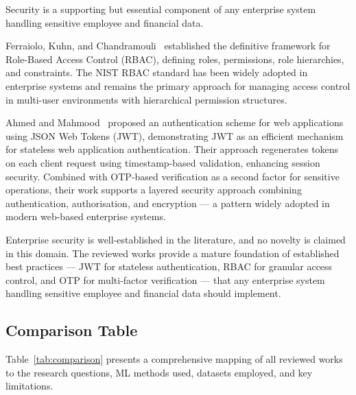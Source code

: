 \documentclass[12pt,a4paper]{article}
\begin{document}
Security is a supporting but essential component of any enterprise system handling sensitive employee and financial data.

Ferraiolo, Kuhn, and Chandramouli~\cite{ferraiolo2007rbac} established the definitive framework for Role-Based Access Control (RBAC), defining roles, permissions, role hierarchies, and constraints. The NIST RBAC standard has been widely adopted in enterprise systems and remains the primary approach for managing access control in multi-user environments with hierarchical permission structures.

Ahmed and Mahmood~\cite{ahmed2019jwt} proposed an authentication scheme for web applications using JSON Web Tokens (JWT), demonstrating JWT as an efficient mechanism for stateless web application authentication. Their approach regenerates tokens on each client request using timestamp-based validation, enhancing session security. Combined with OTP-based verification as a second factor for sensitive operations, their work supports a layered security approach combining authentication, authorisation, and encryption --- a pattern widely adopted in modern web-based enterprise systems.

Enterprise security is well-established in the literature, and no novelty is claimed in this domain. The reviewed works provide a mature foundation of established best practices --- JWT for stateless authentication, RBAC for granular access control, and OTP for multi-factor verification --- that any enterprise system handling sensitive employee and financial data should implement.

\subsection{Comparison Table}
\label{sec:comparison}

Table~\ref{tab:comparison} presents a comprehensive mapping of all reviewed works to the research questions, ML methods used, datasets employed, and key limitations.
\end{document}
